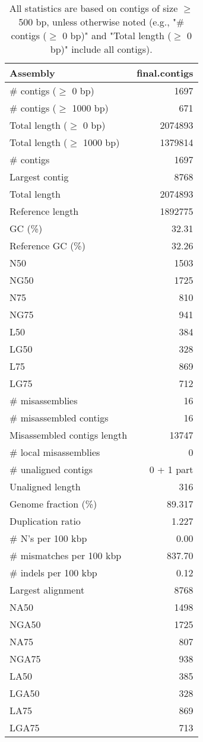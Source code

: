 \documentclass[12pt,a4paper]{article}
\begin{document}
\begin{table}[ht]
\begin{center}
\caption{All statistics are based on contigs of size $\geq$ 500 bp, unless otherwise noted (e.g., "\# contigs ($\geq$ 0 bp)" and "Total length ($\geq$ 0 bp)" include all contigs).}
\begin{tabular}{|l*{1}{|r}|}
\hline
Assembly & final.contigs \\ \hline
\# contigs ($\geq$ 0 bp) & 1697 \\ \hline
\# contigs ($\geq$ 1000 bp) & 671 \\ \hline
Total length ($\geq$ 0 bp) & 2074893 \\ \hline
Total length ($\geq$ 1000 bp) & 1379814 \\ \hline
\# contigs & 1697 \\ \hline
Largest contig & 8768 \\ \hline
Total length & 2074893 \\ \hline
Reference length & 1892775 \\ \hline
GC (\%) & 32.31 \\ \hline
Reference GC (\%) & 32.26 \\ \hline
N50 & 1503 \\ \hline
NG50 & 1725 \\ \hline
N75 & 810 \\ \hline
NG75 & 941 \\ \hline
L50 & 384 \\ \hline
LG50 & 328 \\ \hline
L75 & 869 \\ \hline
LG75 & 712 \\ \hline
\# misassemblies & 16 \\ \hline
\# misassembled contigs & 16 \\ \hline
Misassembled contigs length & 13747 \\ \hline
\# local misassemblies & 0 \\ \hline
\# unaligned contigs & 0 + 1 part \\ \hline
Unaligned length & 316 \\ \hline
Genome fraction (\%) & 89.317 \\ \hline
Duplication ratio & 1.227 \\ \hline
\# N's per 100 kbp & 0.00 \\ \hline
\# mismatches per 100 kbp & 837.70 \\ \hline
\# indels per 100 kbp & 0.12 \\ \hline
Largest alignment & 8768 \\ \hline
NA50 & 1498 \\ \hline
NGA50 & 1725 \\ \hline
NA75 & 807 \\ \hline
NGA75 & 938 \\ \hline
LA50 & 385 \\ \hline
LGA50 & 328 \\ \hline
LA75 & 869 \\ \hline
LGA75 & 713 \\ \hline
\end{tabular}
\end{center}
\end{table}
\end{document}
